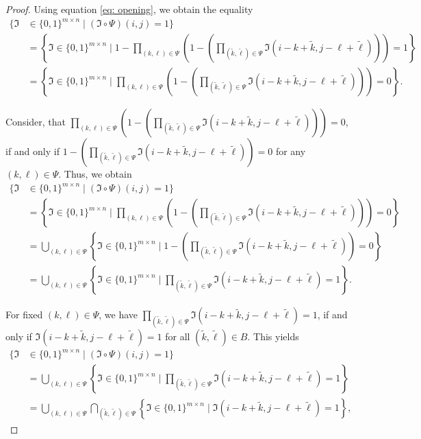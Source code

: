 \documentclass[a4paper,12pt]{article}
\theoremstyle{plain}
\theoremstyle{definition}
\numberwithin{equation}{section}
\begin{document}
\begin{proof}
	Using equation \eqref{eq: opening}, we obtain the equality
	\begin{align*}
		\big\{ \mathfrak{I} &\in \{ 0, 1 \}^{m \times n} \mid (\mathfrak{I} \circ \Psi)(i, j) = 1 \big\} \\
		&= \left\{ \mathfrak{I} \in \{ 0, 1 \}^{m \times n} \mid 1 - \prod_{(k, \ell) \in \Psi} \left( 1 - \left( \prod_{(\tilde{k}, \tilde{\ell}) \in \Psi} \mathfrak{I}(i - k + \tilde{k}, j - \ell + \tilde{\ell}) \right) \right) = 1 \right\} \\
		&= \left\{ \mathfrak{I} \in \{ 0, 1 \}^{m \times n} \mid \prod_{(k, \ell) \in \Psi} \left( 1 - \left( \prod_{(\tilde{k}, \tilde{\ell}) \in \Psi} \mathfrak{I}(i - k + \tilde{k}, j - \ell + \tilde{\ell}) \right) \right) = 0 \right\}.
	\end{align*}
	
	Consider, that $\prod_{(k, \ell) \in \Psi} \left( 1 - \left( \prod_{(\tilde{k}, \tilde{\ell}) \in \Psi} \mathfrak{I}(i - k + \tilde{k}, j - \ell + \tilde{\ell}) \right) \right) = 0$, if and only if $1 - \left( \prod_{(\tilde{k}, \tilde{\ell}) \in \Psi} \mathfrak{I}(i - k + \tilde{k}, j - \ell + \tilde{\ell}) \right) = 0$ for any $(k, \ell) \in \Psi$. Thus, we obtain
	\begin{align*}
		\big\{ \mathfrak{I} &\in \{ 0, 1 \}^{m \times n} \mid (\mathfrak{I} \circ \Psi)(i, j) = 1 \big\} \\
		&= \left\{ \mathfrak{I} \in \{ 0, 1 \}^{m \times n} \mid \prod_{(k, \ell) \in \Psi} \left( 1 - \left( \prod_{(\tilde{k}, \tilde{\ell}) \in \Psi} \mathfrak{I}(i - k + \tilde{k}, j - \ell + \tilde{\ell}) \right) \right) = 0 \right\} \\
		&= \bigcup_{(k, \ell) \in \Psi} \left\{ \mathfrak{I} \in \{ 0, 1 \}^{m \times n} \mid 1 - \left( \prod_{(\tilde{k}, \tilde{\ell}) \in \Psi} \mathfrak{I}(i - k + \tilde{k}, j - \ell + \tilde{\ell}) \right) = 0 \right\} \\
		&= \bigcup_{(k, \ell) \in \Psi} \left\{ \mathfrak{I} \in \{ 0, 1 \}^{m \times n} \mid \prod_{(\tilde{k}, \tilde{\ell}) \in \Psi} \mathfrak{I}(i - k + \tilde{k}, j - \ell + \tilde{\ell}) = 1 \right\}.
	\end{align*}
	
	For fixed $(k, \ell) \in \Psi$, we have $\prod_{(\tilde{k}, \tilde{\ell}) \in \Psi} \mathfrak{I}(i - k + \tilde{k}, j - \ell + \tilde{\ell}) = 1$, if and only if $\mathfrak{I}(i - k + \tilde{k}, j - \ell + \tilde{\ell}) = 1$ for all $(\tilde{k}, \tilde{\ell}) \in B$. This yields
	\begin{align*}
		\big\{ \mathfrak{I} &\in \{ 0, 1 \}^{m \times n} \mid (\mathfrak{I} \circ \Psi)(i, j) = 1 \big\} \\
		&= \bigcup_{(k, \ell) \in \Psi} \left\{ \mathfrak{I} \in \{ 0, 1 \}^{m \times n} \mid \prod_{(\tilde{k}, \tilde{\ell}) \in \Psi} \mathfrak{I}(i - k + \tilde{k}, j - \ell + \tilde{\ell}) = 1 \right\} \\
		&= \bigcup_{(k, \ell) \in \Psi} \bigcap_{(\tilde{k}, \tilde{\ell}) \in \Psi} \left\{ \mathfrak{I} \in \{ 0, 1 \}^{m \times n} \mid \mathfrak{I}(i - k + \tilde{k}, j - \ell + \tilde{\ell}) = 1 \right\},
	\end{align*}
	

\end{proof}
\end{document}
